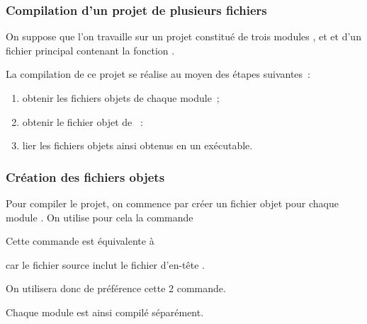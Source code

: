 \begin{frame}[fragile]
\frametitle{Compilation d'un projet de plusieurs fichiers}
On suppose que l'on travaille sur un projet constitué de trois modules
,  et  et d'un fichier principal 
contenant la fonction .
\medskip

La compilation de ce projet se réalise au moyen des étapes suivantes~:
\begin{enumerate}
    \item obtenir les fichiers objets de chaque module~;
    \item obtenir le fichier objet de ~:
    \item lier les fichiers objets ainsi obtenus en un exécutable.
\end{enumerate}
\medskip

\begin{center}
\end{center}
\end{frame}

\begin{frame}[fragile]
\frametitle{Création des fichiers objets}
Pour compiler le projet, on commence par créer un fichier objet pour
chaque module . On utilise pour cela la commande
\begin{center}  \end{center}
\medskip

Cette commande est équivalente à
\begin{center}  \end{center}
car le fichier source  inclut le fichier d'en-tête .
\bigskip

On utilisera donc de préférence cette 2\ieme{} commande.
\bigskip
\bigskip

Chaque module est ainsi \alert{compilé séparément}.
\end{frame}

